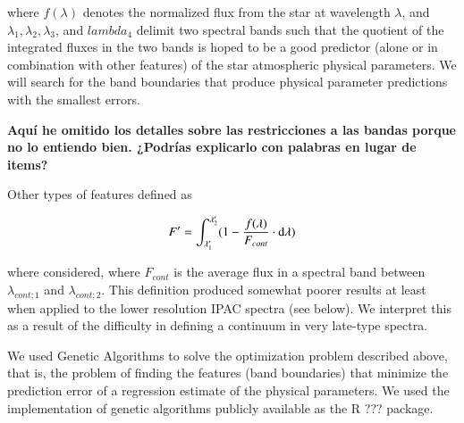 {{where $f(\lambda)$ denotes the normalized flux from the star at
wavelength $\lambda$, and $\lambda_1, \lambda_2, \lambda_3$, and
$lambda_4$ delimit two spectral bands such that the quotient of the
integrated fluxes in the two bands is hoped to be a good predictor
(alone or in combination with other features) of the star atmospheric
physical parameters. We will search for the band boundaries that
produce physical parameter predictions with the smallest errors.

{\bf Aquí he omitido los detalles sobre las restricciones a las bandas
porque no lo entiendo bien. ¿Podrías explicarlo con palabras en lugar
de items?}


Other types of features defined as

\begin{equation}\label{eq:feature2}
  F' = \int_{\lambda'_{1}}^{\lambda'_{2}} (1-\frac{f(\lambda)}{F_{cont}} \cdot {\rm d}{\lambda})
\end{equation}

where considered, where $F_{cont}$ is the average flux in a spectral
band between $\lambda_{cont;1}$ and $\lambda_{cont;2}$. This
definition produced somewhat poorer results at least when applied to
the lower resolution IPAC spectra (see below). We interpret this as a
result of the difficulty in defining a continuum in very late-type
spectra. 

We used Genetic Algorithms to solve the optimization problem described
above, that is, the problem of finding the features (band boundaries)
that minimize the prediction error of a regression estimate of the
physical parameters. We used the implementation of genetic algorithms
publicly available as the R \citep{R2013} ???  package.

}}

